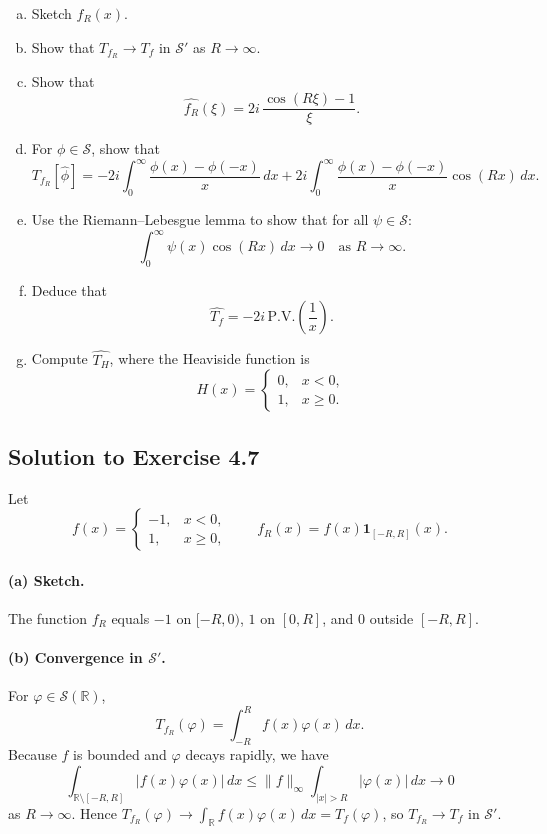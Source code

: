 \documentclass[12pt,a4paper]{article}
\theoremstyle{plain}
\theoremstyle{definition}
\theoremstyle{remark}
\theoremstyle{remark}
\begin{document}
\begin{enumerate}[(a)]
	\item Sketch $f_R(x)$.
	
	\item Show that $T_{f_R} \to T_f$ in $\mathcal{S}'$ as $R\to\infty$.
	
	\item Show that
	\[
	\widehat{f_R}(\xi) = 
	2i\,\frac{\cos(R\xi)-1}{\xi}.
	\]
	
	\item For $\phi\in\mathcal{S}$, show that
	\[
	T_{f_R}[\widehat{\phi}]
	= -2i\int_0^\infty \frac{\phi(x)-\phi(-x)}{x}\,dx
	+ 2i\int_0^\infty \frac{\phi(x)-\phi(-x)}{x}\cos(Rx)\,dx.
	\]
	
	\item Use the Riemann--Lebesgue lemma to show that for all $\psi\in\mathcal{S}$:
	\[
	\int_0^\infty \psi(x)\cos(Rx)\,dx \to 0
	\quad \text{as } R\to\infty.
	\]
	
	\item Deduce that
	\[
	\widehat{T_f} = -2i\,\mathrm{P.V.}\!\left(\frac{1}{x}\right).
	\]
	
	\item Compute $\widehat{T_H}$, where the Heaviside function is
	\[
	H(x)=
	\begin{cases}
		0, & x<0,\\[0.2em]
		1, & x\ge 0.
	\end{cases}
	\]
\end{enumerate}

\subsection*{Solution to Exercise 4.7}

Let
\[
f(x) =
\begin{cases}
	-1, & x<0,\\[0.2em]
	1,  & x\ge 0,
\end{cases}
\qquad
f_R(x) = f(x)\mathbf{1}_{[-R,R]}(x).
\]

\paragraph{(a) Sketch.}
The function $f_R$ equals $-1$ on $[-R,0)$, $1$ on $[0,R]$, and $0$ outside
$[-R,R]$.

\paragraph{(b) Convergence in $\mathcal{S}'$.}
For $\varphi\in\mathcal{S}(\mathbb{R})$,
\[
T_{f_R}(\varphi)
= \int_{-R}^{R} f(x)\varphi(x)\,dx.
\]
Because $f$ is bounded and $\varphi$ decays rapidly, we have
\[
\int_{\mathbb{R}\setminus[-R,R]} |f(x)\varphi(x)|\,dx
\le \|f\|_{\infty}\int_{|x|>R} |\varphi(x)|\,dx \to 0
\]
as $R\to\infty$.  Hence
$T_{f_R}(\varphi)\to \int_{\mathbb{R}} f(x)\varphi(x)\,dx = T_f(\varphi)$,
so $T_{f_R}\to T_f$ in $\mathcal{S}'$.
\end{document}
